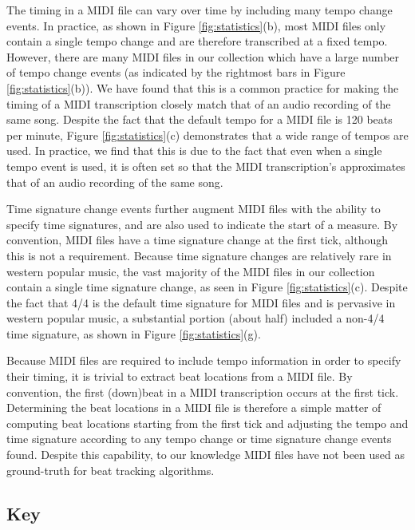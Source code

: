 \documentclass{article}
\begin{document}
The timing in a MIDI file can vary over time by including many tempo change events.
In practice, as shown in Figure \ref{fig:statistics}(b), most MIDI files only contain a single tempo change and are therefore transcribed at a fixed tempo.
However, there are many MIDI files in our collection which have a large number of tempo change events (as indicated by the rightmost bars in Figure \ref{fig:statistics}(b)).
We have found that this is a common practice for making the timing of a MIDI transcription closely match that of an audio recording of the same song.
Despite the fact that the default tempo for a MIDI file is 120 beats per minute, Figure \ref{fig:statistics}(c) demonstrates that a wide range of tempos are used.
In practice, we find that this is due to the fact that even when a single tempo event is used, it is often set so that the MIDI transcription's approximates that of an audio recording of the same song.

Time signature change events further augment MIDI files with the ability to specify time signatures, and are also used to indicate the start of a measure.
By convention, MIDI files have a time signature change at the first tick, although this is not a requirement.
Because time signature changes are relatively rare in western popular music, the vast majority of the MIDI files in our collection contain a single time signature change, as seen in Figure \ref{fig:statistics}(c).
Despite the fact that 4/4 is the default time signature for MIDI files and is pervasive in western popular music, a substantial portion (about half) included a non-4/4 time signature, as shown in Figure \ref{fig:statistics}(g).

Because MIDI files are required to include tempo information in order to specify their timing, it is trivial to extract beat locations from a MIDI file.
By convention, the first (down)beat in a MIDI transcription occurs at the first tick.
Determining the beat locations in a MIDI file is therefore a simple matter of computing beat locations starting from the first tick and adjusting the tempo and time signature according to any tempo change or time signature change events found.
Despite this capability, to our knowledge MIDI files have not been used as ground-truth for beat tracking algorithms.

\subsection{Key}
\end{document}
